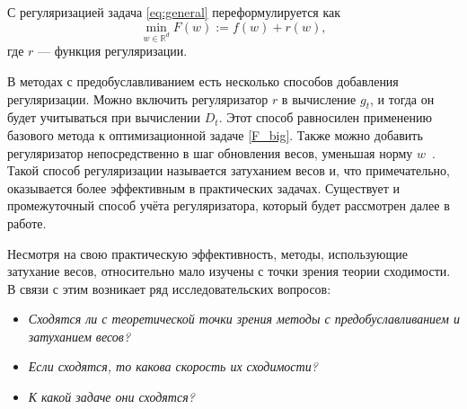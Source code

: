 С регуляризацией задача \eqref{eq:general} переформулируется как
\begin{equation} \label{F_big}
	\min_{w \in \mathbb{R}^d} F(w) := f(w) + r(w),
\end{equation}
где $r$ --- функция регуляризации.

В методах с предобуславливанием есть несколько способов добавления регуляризации.
Можно включить регуляризатор $r$ в вычисление $g_t$, и тогда он будет учитываться при вычислении $D_t$. Этот способ равносилен применению базового метода к оптимизационной задаче \eqref{F_big}.
Также можно добавить регуляризатор непосредственно в шаг обновления весов, уменьшая норму $w$~\citep{loshchilov2017decoupled}.
Такой способ регуляризации называется затуханием весов и, что примечательно, оказывается более эффективным в практических задачах.
Существует и промежуточный способ учёта регуляризатора, который будет рассмотрен далее в работе.

Несмотря на свою практическую эффективность, методы, использующие затухание весов, относительно мало изучены с точки зрения теории сходимости.
В связи с этим возникает ряд исследовательских вопросов:
\begin{itemize}
    \item \textit{Сходятся ли с теоретической точки зрения методы с предобуславливанием и затуханием весов?}
    \item \textit{Если сходятся, то какова скорость их сходимости?}
    \item \textit{К какой задаче они сходятся?}
\end{itemize}
